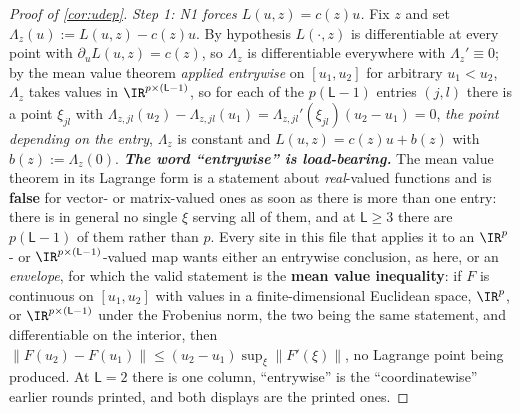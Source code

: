 \begin{proof}[Proof of \cref{cor:udep}]
\emph{Step 1: N1 forces $L(u,z)=c(z)u$.}
Fix $z$ and set $\Lambda_z(u):=L(u,z)-c(z)u$. By hypothesis $L(\cdot,z)$ is differentiable at every
point with $\partial_uL(u,z)=c(z)$, so $\Lambda_z$ is differentiable everywhere with
$\Lambda_z'\equiv0$; by the mean value theorem \emph{applied entrywise} on $[u_1,u_2]$ for arbitrary
$u_1<u_2$, $\Lambda_z$ takes values in $\IR^{p\times(\mathsf L-1)}$, so for each of the
$p(\mathsf L-1)$ entries $(j,l)$ there is a point $\xi_{jl}$ with
$\Lambda_{z,jl}(u_2)-\Lambda_{z,jl}(u_1)=\Lambda_{z,jl}'(\xi_{jl})(u_2-u_1)=0$, \emph{the point depending
on the entry}, $\Lambda_z$ is constant and
$L(u,z)=c(z)u+b(z)$ with $b(z):=\Lambda_z(0)$.
\emph{\textbf{The word ``entrywise'' is load-bearing.}} The
mean value theorem in its Lagrange form is a statement about \emph{real}-valued functions and is
\textbf{false} for vector- or matrix-valued ones as soon as there is more than one entry: there is in
general no single $\xi$ serving all of them, and at $\mathsf L\ge3$ there are $p(\mathsf L-1)$ of them
rather than $p$. Every site in this file that applies it to an $\IR^{p}$- or
$\IR^{p\times(\mathsf L-1)}$-valued map wants
either an entrywise conclusion, as here, or an \emph{envelope}, for which the valid statement is the
\textbf{mean value inequality}: if $F$ is continuous on $[u_1,u_2]$ with values in a finite-dimensional
Euclidean space, $\IR^{p}$, or $\IR^{p\times(\mathsf L-1)}$ under the Frobenius norm, the two being
the same statement, and
differentiable on the interior, then
$\|F(u_2)-F(u_1)\|\le(u_2-u_1)\sup_{\xi}\|F'(\xi)\|$, no Lagrange point being produced.
At $\mathsf L=2$ there is one column, ``entrywise'' is the ``coordinatewise'' earlier rounds
printed, and both displays are the printed ones.

\end{proof}
